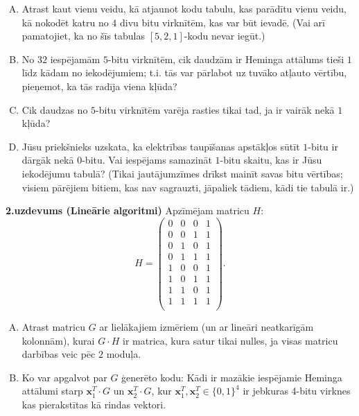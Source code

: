 \documentclass[a4paper]{article}
\begin{document}
\begin{enumerate}[(A)]
\item Atrast kaut vienu veidu, kā atjaunot kodu tabulu,
kas parādītu vienu veidu, kā nokodēt katru no $4$ divu bitu virknītēm, 
kas var būt ievadē. (Vai arī pamatojiet, ka no šīs tabulas 
$[5,2,1]$-kodu nevar iegūt.)
\item No $32$ iespējamām $5$-bitu virknītēm, cik dau\-dzām 
ir Heminga attālums tieši $1$
līdz kādam no iekodējumiem; t.i. tās var pārlabot uz tuvāko atļauto vērtību,
pieņemot, ka tās radīja viena kļūda?
\item Cik daudzas no $5$-bitu virknītēm 
varēja ras\-ties tikai tad, ja ir vairāk nekā $1$ kļūda?
\item Jūsu priekšnieks uzskata, ka elektrības tau\-pī\-ša\-nas apstākļos
sūtīt $1$-bitu ir dārgāk nekā $0$-bitu.
Vai iespējams samazināt $1$-bitu skai\-tu, kas ir Jūsu iekodējumu tabulā?
(Tikai jau\-tā\-jum\-zī\-mes drīkst mainīt 
savas bitu vēr\-tī\-bas; visiem pārējiem bitiem,
kas nav sagrauzti, jāpaliek tādiem, kādi tie tabulā ir.)
\end{enumerate}

\vspace{20pt}
{\bf 2.uzdevums (Lineārie algoritmi) }
Apzīmējam matricu $H$:
{\footnotesize
$$H = \left( \begin{array}{cccc}
0 & 0 & 0 & 1 \\
0 & 0 & 1 & 1 \\
0 & 1 & 0 & 1 \\
0 & 1 & 1 & 1 \\
1 & 0 & 0 & 1 \\
1 & 0 & 1 & 1 \\
1 & 1 & 0 & 1 \\
1 & 1 & 1 & 1 \\
\end{array} \right).$$
}

\begin{enumerate}[(A)]
\item
Atrast matricu $G$ ar lielākajiem izmēriem (un ar lineāri neatkarīgām kolonnām), kurai 
$G \cdot H$ ir matrica, kura satur tikai nulles, ja visas matricu darbības veic pēc $2$ moduļa. 
\item Ko var apgalvot par $G$ ģenerēto kodu: Kādi ir mazākie iespējamie Heminga attālumi 
starp $\mathbf{x}_1^T \cdot G$ un $\mathbf{x}_2^T \cdot G$, kur
$\mathbf{x}_1^T, \mathbf{x}_2^T \in \{ 0,1 \}^4$ ir jebkuras 4-bitu virknes
kas pierakstītas kā rindas vektori.
\end{enumerate}
\end{document}
